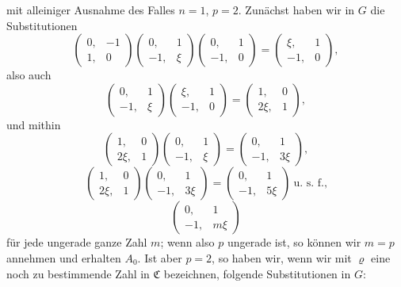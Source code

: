 mit alleiniger Ausnahme des Falles $n=1$, $p=2$. Zun\"achst haben wir in $G$ die Substitutionen
\[
\begin{pmatrix} 0, & -1 \\ 1, & 0 \end{pmatrix}\begin{pmatrix} 0, & 1 \\ -1, & \xi \end{pmatrix}\begin{pmatrix} 0, & 1 \\ -1, & 0 \end{pmatrix} = \begin{pmatrix} \xi, & 1 \\ -1, & 0 \end{pmatrix},
\]
also auch
\[
\begin{pmatrix} 0, & 1 \\ -1, & \xi \end{pmatrix}\begin{pmatrix} \xi, & 1 \\ -1, & 0 \end{pmatrix} = \begin{pmatrix} 1, & 0 \\ 2\xi, & 1 \end{pmatrix},
\]
und mithin
\[
\begin{pmatrix} 1, & 0 \\ 2\xi, & 1 \end{pmatrix}\begin{pmatrix} 0, & 1 \\ -1, & \xi \end{pmatrix} = \begin{pmatrix} 0, & 1 \\ -1, & 3\xi \end{pmatrix},
\]
\[
\begin{pmatrix} 1, & 0 \\ 2\xi, & 1 \end{pmatrix}\begin{pmatrix} 0, & 1 \\ -1, & 3\xi \end{pmatrix} = \begin{pmatrix} 0, & 1 \\ -1, & 5\xi \end{pmatrix} \ \text{u. s. f.,}
\]
\[
\begin{pmatrix} 0, & 1 \\ -1, & m\xi \end{pmatrix}
\]
f\"ur jede ungerade ganze Zahl $m$; wenn also $p$ ungerade ist, so k\"onnen wir $m=p$ annehmen und erhalten $A_0$. Ist aber $p=2$, so haben wir, wenn wir mit $\varrho$ eine noch zu bestimmende Zahl in $\mathfrak{C}$ bezeichnen, folgende Substitutionen in $G$:
